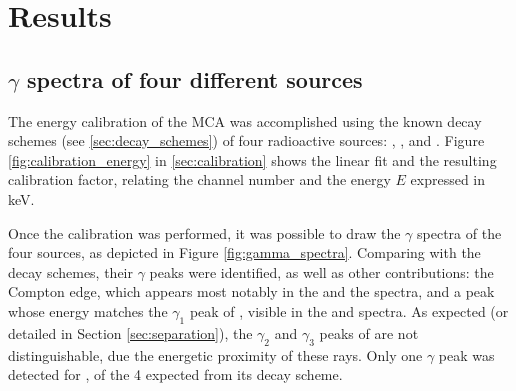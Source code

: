 \section{Results}
\subsection{$\gamma$ spectra of four different sources}
The energy calibration of the MCA was accomplished using the known decay 
schemes (see \autoref{sec:decay_schemes}) of four radioactive sources: 
\cesium, \cobalt, \lead and \hafnium.
Figure \ref{fig:calibration_energy} in \autoref{sec:calibration} 
shows the linear fit and the resulting calibration factor, 
relating the channel number and the energy $E$ expressed in keV.

Once the calibration was performed, it was possible to draw the $\gamma$ spectra 
of the four sources, as depicted in Figure \ref{fig:gamma_spectra}.
Comparing with the decay schemes, their $\gamma$ peaks were identified,
as well as other contributions:
the Compton edge, which appears most notably in the \cesium 
and the \lead spectra, and a peak whose energy matches the $\gamma_1$ peak of \lead,
visible in the \cesium and \hafnium spectra. 
As expected (or detailed in Section \ref{sec:separation}), the $\gamma_2$ and $\gamma_3$ peaks of \cobalt are not distinguishable, due the energetic proximity of these rays.
Only one $\gamma$ peak was detected for \hafnium, of the 4 expected from its decay scheme.

